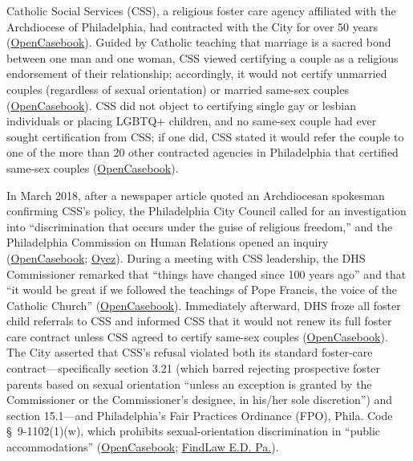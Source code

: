\documentclass[12pt]{article}
\begin{document}
Catholic Social Services (CSS), a religious foster care agency affiliated with the Archdiocese of Philadelphia, had contracted with the City for over 50 years (\href{https://opencasebook.org/casebooks/4501-constitutional-law/resources/12.9-fulton-v-city-of-philadelphia-2020/}{OpenCasebook}). Guided by Catholic teaching that marriage is a sacred bond between one man and one woman, CSS viewed certifying a couple as a religious endorsement of their relationship; accordingly, it would not certify unmarried couples (regardless of sexual orientation) or married same-sex couples (\href{https://opencasebook.org/casebooks/4501-constitutional-law/resources/12.9-fulton-v-city-of-philadelphia-2020/}{OpenCasebook}). CSS did not object to certifying single gay or lesbian individuals or placing LGBTQ+ children, and no same-sex couple had ever sought certification from CSS; if one did, CSS stated it would refer the couple to one of the more than 20 other contracted agencies in Philadelphia that certified same-sex couples (\href{https://opencasebook.org/casebooks/4501-constitutional-law/resources/12.9-fulton-v-city-of-philadelphia-2020/}{OpenCasebook}).

In March 2018, after a newspaper article quoted an Archdiocesan spokesman confirming CSS's policy, the Philadelphia City Council called for an investigation into ``discrimination that occurs under the guise of religious freedom,'' and the Philadelphia Commission on Human Relations opened an inquiry (\href{https://opencasebook.org/casebooks/4501-constitutional-law/resources/12.9-fulton-v-city-of-philadelphia-2020/}{OpenCasebook}; \href{https://www.oyez.org/cases/2020/19-123}{Oyez}). During a meeting with CSS leadership, the DHS Commissioner remarked that ``things have changed since 100 years ago'' and that ``it would be great if we followed the teachings of Pope Francis, the voice of the Catholic Church'' (\href{https://opencasebook.org/casebooks/4501-constitutional-law/resources/12.9-fulton-v-city-of-philadelphia-2020/}{OpenCasebook}). Immediately afterward, DHS froze all foster child referrals to CSS and informed CSS that it would not renew its full foster care contract unless CSS agreed to certify same-sex couples (\href{https://opencasebook.org/casebooks/4501-constitutional-law/resources/12.9-fulton-v-city-of-philadelphia-2020/}{OpenCasebook}). The City asserted that CSS's refusal violated both its standard foster-care contract---specifically section 3.21 (which barred rejecting prospective foster parents based on sexual orientation ``unless an exception is granted by the Commissioner or the Commissioner's designee, in his/her sole discretion'') and section 15.1---and Philadelphia's Fair Practices Ordinance (FPO), Phila. Code \S~9-1102(1)(w), which prohibits sexual-orientation discrimination in ``public accommodations'' (\href{https://opencasebook.org/casebooks/4501-constitutional-law/resources/12.9-fulton-v-city-of-philadelphia-2020/}{OpenCasebook}; \href{https://caselaw.findlaw.com/court/us-dis-crt-ed-pen/1943877.html}{FindLaw E.D. Pa.}).
\end{document}
